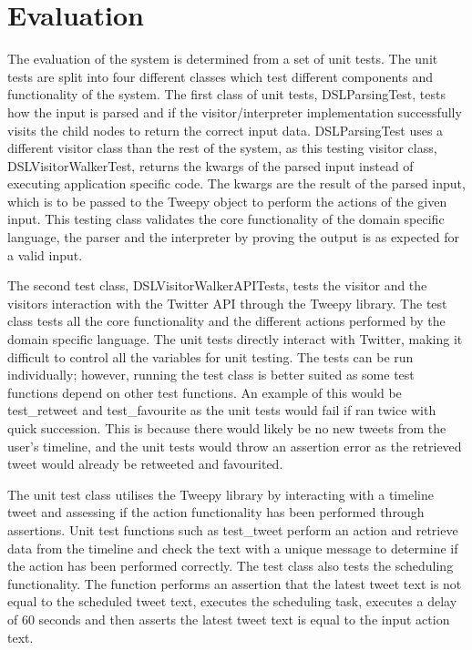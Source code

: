 \chapter{Evaluation}

The evaluation of the system is determined from a set of unit tests. The unit tests are split into four different classes which test different components and functionality of the system. The first class of unit tests, DSLParsingTest, tests how the input is parsed and if the visitor/interpreter implementation successfully visits the child nodes to return the correct input data. DSLParsingTest uses a different visitor class than the rest of the system, as this testing visitor class, DSLVisitorWalkerTest, returns the kwargs of the parsed input instead of executing application specific code. The kwargs are the result of the parsed input, which is to be passed to the Tweepy object to perform the actions of the given input. This testing class validates the core functionality of the domain specific language, the parser and the interpreter by proving the output is as expected for a valid input. \newline \par

The second test class, DSLVisitorWalkerAPITests, tests the visitor and the visitors interaction with the Twitter API through the Tweepy library. The test class tests all the core functionality and the different actions performed by the domain specific language. The unit tests directly interact with Twitter, making it difficult to control all the variables for unit testing. The tests can be run individually; however, running the test class is better suited as some test functions depend on other test functions. An example of this would be test\_retweet and test\_favourite as the unit tests would fail if ran twice with quick succession. This is because there would likely be no new tweets from the user's timeline, and the unit tests would throw an assertion error as the retrieved tweet would already be retweeted and favourited. \newline \par

The unit test class utilises the Tweepy library by interacting with a timeline tweet and assessing if the action functionality has been performed through assertions. Unit test functions such as test\_tweet perform an action and retrieve data from the timeline and check the text with a unique message to determine if the action has been performed correctly. The test class also tests the scheduling functionality. The function performs an assertion that the latest tweet text is not equal to the scheduled tweet text, executes the scheduling task, executes a delay of 60 seconds and then asserts the latest tweet text is equal to the input action text. \newline \par

